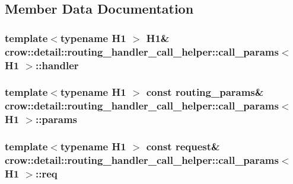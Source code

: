 \subsection{Member Data Documentation}
\hypertarget{structcrow_1_1detail_1_1routing__handler__call__helper_1_1call__params_a4ce1d7e1b3b191aaaea19bbc3ad61e0d}{
\subsubsection[{handler}]{\setlength{\rightskip}{0pt plus 5cm}template$<$typename H1 $>$ H1\& {\bf crow\-::detail\-::routing\-\_\-handler\-\_\-call\-\_\-helper\-::call\-\_\-params}$<$ H1 $>$\-::handler}}\label{structcrow_1_1detail_1_1routing__handler__call__helper_1_1call__params_a4ce1d7e1b3b191aaaea19bbc3ad61e0d}
\hypertarget{structcrow_1_1detail_1_1routing__handler__call__helper_1_1call__params_a3e6c2066cd82b91d35550db36513d4bc}{
\subsubsection[{params}]{\setlength{\rightskip}{0pt plus 5cm}template$<$typename H1 $>$ const {\bf routing\-\_\-params}\& {\bf crow\-::detail\-::routing\-\_\-handler\-\_\-call\-\_\-helper\-::call\-\_\-params}$<$ H1 $>$\-::params}}\label{structcrow_1_1detail_1_1routing__handler__call__helper_1_1call__params_a3e6c2066cd82b91d35550db36513d4bc}
\hypertarget{structcrow_1_1detail_1_1routing__handler__call__helper_1_1call__params_a1938f3328078453302e5a7a4fa994a40}{
\subsubsection[{req}]{\setlength{\rightskip}{0pt plus 5cm}template$<$typename H1 $>$ const {\bf request}\& {\bf crow\-::detail\-::routing\-\_\-handler\-\_\-call\-\_\-helper\-::call\-\_\-params}$<$ H1 $>$\-::req}}\label{structcrow_1_1detail_1_1routing__handler__call__helper_1_1call__params_a1938f3328078453302e5a7a4fa994a40}
